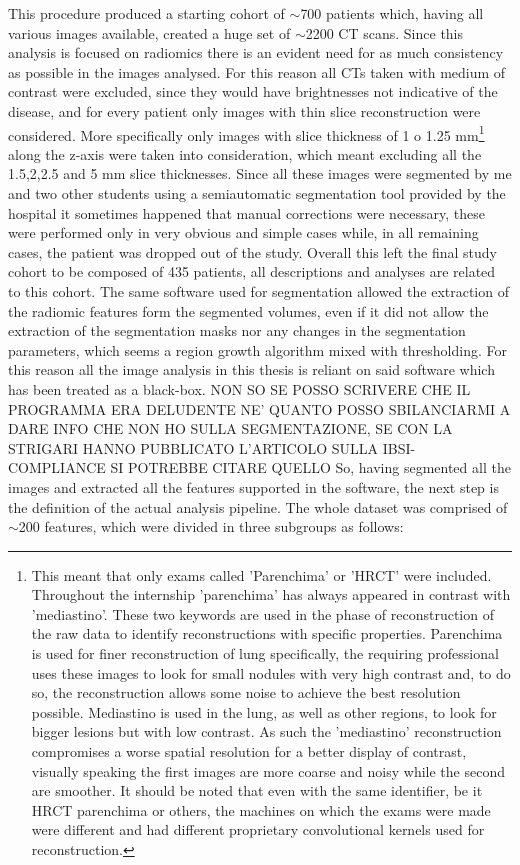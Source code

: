 This procedure produced a starting cohort of $\sim$700 patients which, having all various images available, created a huge set of $\sim$2200 CT scans. Since this analysis is focused on radiomics there is an evident need for as much consistency as possible in the images analysed. For this reason all CTs taken with medium of contrast were excluded, since they would have brightnesses not indicative of the disease, and for every patient only images with thin slice reconstruction were considered. More specifically only images with slice thickness of 1 o 1.25 mm\footnote{This meant that only exams called 'Parenchima' or  'HRCT' were included. Throughout the internship 'parenchima' has always appeared in contrast with 'mediastino'. These two keywords are used in the phase of reconstruction of the raw data to identify reconstructions with specific properties. Parenchima is used for finer reconstruction of lung specifically, the requiring professional uses these images to look for small nodules with very high contrast and, to do so, the reconstruction allows some noise to achieve the best resolution possible. Mediastino is used in the lung, as well as other regions, to look for bigger lesions but with low contrast. As such the 'mediastino' reconstruction compromises a worse spatial resolution for a better display of contrast, visually speaking the first images are more coarse and noisy while the second are smoother. It should be noted that even with the same identifier, be it HRCT parenchima or others, the machines on which the exams were made were different and had different proprietary convolutional kernels used for reconstruction.} along the z-axis were taken into consideration, which meant excluding all the 1.5,2,2.5 and 5 mm slice thicknesses.
Since all these images were segmented by me and two other students using a semiautomatic segmentation tool provided by the hospital it sometimes happened that manual corrections were necessary, these were performed only in very obvious and simple cases while, in all remaining cases, the patient was dropped out of the study.
Overall this left the final study cohort to be composed of 435 patients, all descriptions and analyses are related to this cohort.
The same software used for segmentation allowed the extraction of the radiomic features form the segmented volumes, even if it did not allow the extraction of the segmentation masks nor any changes in the segmentation parameters, which seems a region growth algorithm mixed with thresholding. For this reason all the image analysis in this thesis is reliant on said software which has been treated as a black-box.
{\large NON SO SE POSSO SCRIVERE CHE IL PROGRAMMA ERA DELUDENTE NE' QUANTO POSSO SBILANCIARMI A DARE INFO CHE NON HO SULLA SEGMENTAZIONE, SE CON LA STRIGARI HANNO PUBBLICATO L'ARTICOLO SULLA IBSI-COMPLIANCE SI POTREBBE CITARE QUELLO}
So, having segmented all the images and extracted all the features supported in the software, the next step is the definition of the actual analysis pipeline. The whole dataset was comprised of $\sim$200 features, which were divided in three subgroups as follows:

